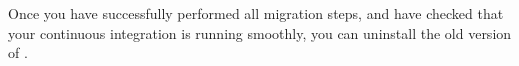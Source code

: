 Once you have successfully performed all migration steps, and have checked that your continuous integration is running smoothly, you can uninstall the old version of \app{}. 
